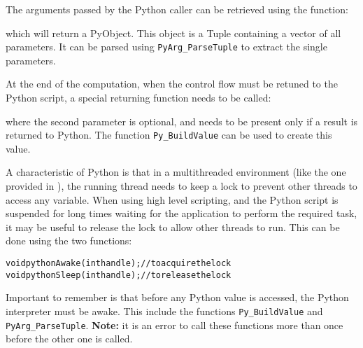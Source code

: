 The arguments passed by the Python caller can be retrieved using the function:


which will return a PyObject. This object is a Tuple containing a vector of all
parameters. It can be parsed using \texttt{PyArg\_ParseTuple} to extract the
single parameters.

At the end of the computation, when the control flow must be retuned to the
Python script, a special returning function needs to be called:


where the second parameter is optional, and needs to be present only if a result
is returned to Python. The function \texttt{Py\_BuildValue} can be used to create
this value.

A characteristic of Python is that in a multithreaded environment (like the one
provided in \charmpp{}), the running thread needs to keep a lock to prevent
other threads to access any variable. When using high level scripting, and the
Python script is suspended for long times waiting for the \charmpp{} application
to perform the required task, it may be useful to release the lock to allow
other threads to run. This can be done using the two functions:

\begin{alltt}
void pythonAwake(int handle);   // to acquire the lock
void pythonSleep(int handle);   // to release the lock
\end{alltt}

Important to remember is that before any Python value is accessed, the Python
interpreter must be awake. This include the functions \texttt{Py\_BuildValue} and
\texttt{PyArg\_ParseTuple}. \textbf{Note:} it is an error to call these functions
more than once before the other one is called.
